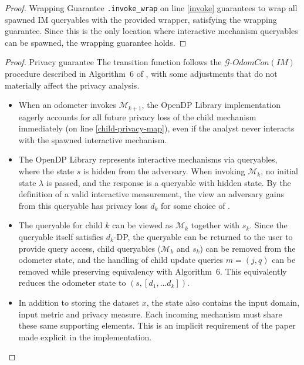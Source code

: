 \documentclass{article}
\begin{document}
\begin{proof} \textup{Wrapping Guarantee}
    \texttt{.invoke\_wrap} on line \ref{invoke} guarantees to wrap all spawned IM queryables with the provided wrapper,
    satisfying the wrapping guarantee.
    Since this is the only location where interactive mechanism queryables can be spawned,
    the wrapping guarantee holds.
\end{proof}

\begin{proof} \textup{Privacy guarantee}
    The transition function follows the $\mathcal{G}\text{-}OdomCon(IM)$ procedure described in Algorithm~6 of \cite{haney2023concurrentcompositioninteractivedifferential},
    with some adjustments that do not materially affect the privacy analysis.

    \begin{itemize}
        \item When an odometer invokes $\mathcal{M}_{k+1}$, 
        the OpenDP Library implementation eagerly accounts for all future privacy loss of the child mechanism immediately (on line \ref{child-privacy-map}),
        even if the analyst never interacts with the spawned interactive mechanism.
        \item The OpenDP Library represents interactive mechanisms via queryables,
        where the state $s$ is hidden from the adversary. When invoking $\mathcal{M}_k$,
        no initial state $\lambda$ is passed, and the response is a queryable with hidden state.
        By the definition of a valid interactive measurement, the view an adversary gains from this queryable has privacy loss $d_k$
        for some choice of \din.
        \item The queryable for child $k$ can be viewed as $\mathcal{M}_k$ together with $s_k$.
        Since the queryable itself satisfies $d_k$-DP, the queryable can be returned to the user to provide query access, 
        child queryables ($\mathcal{M}_k$ and $s_k$) can be removed from the odometer state,
        and the handling of child update queries $m = (j, q)$ can be removed while preserving equivalency with Algorithm~6.
        This equivalently reduces the odometer state to $(s, [d_1, ... d_k])$.
        \item In addition to storing the dataset $x$, 
        the state also contains the input domain, input metric and privacy measure.
        Each incoming mechanism must share these same supporting elements.
        This is an implicit requirement of the paper made explicit in the implementation.
    \end{itemize}


\end{proof}
\end{document}
